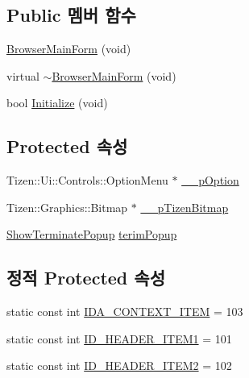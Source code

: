 \subsection*{Public 멤버 함수}
\begin{DoxyCompactItemize}
\item 
\hyperlink{class_browser_main_form_a8d1371e75706b74696b98fd7844fa944}{Browser\+Main\+Form} (void)
\item 
virtual \hyperlink{class_browser_main_form_a5b2bbb6ac4772c7ae7d15b46328afeb6}{$\sim$\+Browser\+Main\+Form} (void)
\item 
bool \hyperlink{class_browser_main_form_a738a1181319a716227fd2ae0feb26c98}{Initialize} (void)
\end{DoxyCompactItemize}
\subsection*{Protected 속성}
\begin{DoxyCompactItemize}
\item 
Tizen\+::\+Ui\+::\+Controls\+::\+Option\+Menu $\ast$ \hyperlink{class_browser_main_form_a6767421f0f61a506e9b187449676fda2}{\+\_\+\+\_\+p\+Option}
\item 
Tizen\+::\+Graphics\+::\+Bitmap $\ast$ \hyperlink{class_browser_main_form_a9ebb215a8612469b49cd95dee767e9cc}{\+\_\+\+\_\+p\+Tizen\+Bitmap}
\item 
\hyperlink{class_show_terminate_popup}{Show\+Terminate\+Popup} \hyperlink{class_browser_main_form_a80aa3a53602f568da86d0f3931b5a06d}{terim\+Popup}
\end{DoxyCompactItemize}
\subsection*{정적 Protected 속성}
\begin{DoxyCompactItemize}
\item 
static const int \hyperlink{class_browser_main_form_a0a7d8a0178a9034082799ab0aeeb28f0}{I\+D\+A\+\_\+\+C\+O\+N\+T\+E\+X\+T\+\_\+\+I\+T\+E\+M} = 103
\item 
static const int \hyperlink{class_browser_main_form_a53791859561cacbbdb6f3089f64fb9fc}{I\+D\+\_\+\+H\+E\+A\+D\+E\+R\+\_\+\+I\+T\+E\+M1} = 101
\item 
static const int \hyperlink{class_browser_main_form_ab0a39b9df377880f65a4753679f43864}{I\+D\+\_\+\+H\+E\+A\+D\+E\+R\+\_\+\+I\+T\+E\+M2} = 102
\end{DoxyCompactItemize}
